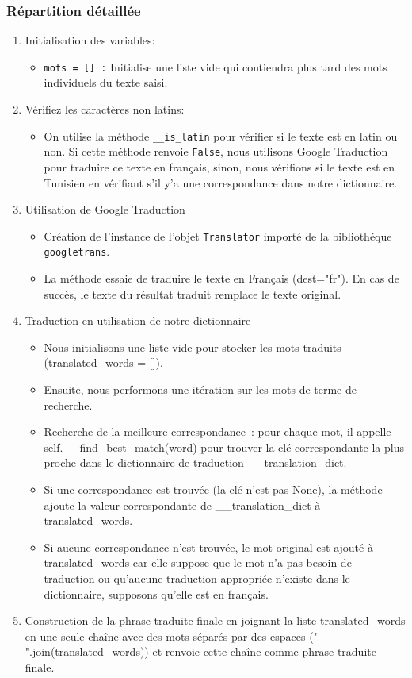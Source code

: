 \subsubsection{Répartition détaillée}
\begin{enumerate}
	\item Initialisation des variables:
	      \begin{itemize}
		      \item \texttt{mots = [] :} Initialise une liste vide qui contiendra plus tard des mots individuels du texte saisi.
	      \end{itemize}
	\item Vérifiez les caractères non latins:
	      \begin{itemize}
		      \item On utilise la méthode \texttt{\_\_is\_latin} pour vérifier si le texte est en latin ou non. Si cette méthode renvoie \texttt{False}, nous utilisons Google Traduction pour traduire ce texte en français, sinon, nous vérifions si le texte est en Tunisien en vérifiant s'il y'a une correspondance dans notre dictionnaire.
	      \end{itemize}
	\item Utilisation de Google Traduction
	      \begin{itemize}
		      \item Création de l'instance de l'objet \texttt{Translator} importé de la bibliothéque \texttt{googletrans}.
		      \item La méthode essaie de traduire le texte en Français (dest="fr"). En cas de succès, le texte du résultat traduit remplace le texte original.
	      \end{itemize}
	\item Traduction en utilisation de notre dictionnaire
	      \begin{itemize}
		      \item Nous initialisons une liste vide pour stocker les mots traduits (translated\_words = []).
		      \item Ensuite, nous performons une itération sur les mots de terme de recherche.
		      \item Recherche de la meilleure correspondance : pour chaque mot, il appelle self.\_\_find\_best\_match(word) pour trouver la clé correspondante la plus proche dans le dictionnaire de traduction \_\_translation\_dict.
		      \item Si une correspondance est trouvée (la clé n'est pas None), la méthode ajoute la valeur correspondante de \_\_translation\_dict à translated\_words.
		      \item Si aucune correspondance n'est trouvée, le mot original est ajouté à translated\_words car elle suppose que le mot n'a pas besoin de traduction ou qu'aucune traduction appropriée n'existe dans le dictionnaire, supposons qu'elle est en français.
	      \end{itemize}
	\item Construction de la phrase traduite finale en joignant la liste translated\_words en une seule chaîne avec des mots séparés par des espaces (" ".join(translated\_words)) et renvoie cette chaîne comme phrase traduite finale.
\end{enumerate}

